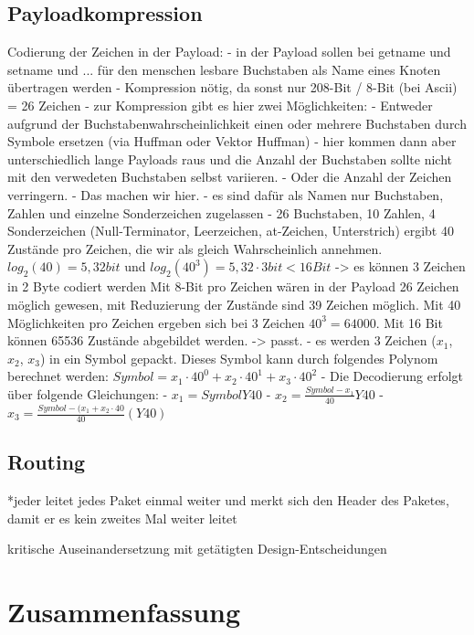 \documentclass{IEEEtran}
\begin{document}
    \subsection{Payloadkompression}
    Codierung der Zeichen in der Payload: 
    - in der Payload sollen bei getname und setname und ... für den menschen lesbare Buchstaben als Name eines Knoten übertragen werden
    - Kompression nötig, da sonst nur 208-Bit / 8-Bit (bei Ascii) = 26 Zeichen
    - zur Kompression gibt es hier zwei Möglichkeiten: 
    - Entweder aufgrund der Buchstabenwahrscheinlichkeit einen oder mehrere Buchstaben durch Symbole ersetzen (via Huffman oder Vektor Huffman)
    - hier kommen dann aber unterschiedlich lange Payloads raus und die Anzahl der Buchstaben sollte nicht mit den verwedeten Buchstaben selbst variieren.
    - Oder die Anzahl der Zeichen verringern.
    - Das machen wir hier.
    - es sind dafür als Namen nur Buchstaben, Zahlen und einzelne Sonderzeichen zugelassen
    - 26 Buchstaben, 10 Zahlen, 4 Sonderzeichen (Null-Terminator, Leerzeichen, at-Zeichen, Unterstrich) ergibt 40 Zustände pro Zeichen, die wir als gleich Wahrscheinlich annehmen.
    $log_{2}(40) = 5,32 bit$
    und 
    $log_{2}(40^3) = 5,32 \cdot 3 bit < 16 Bit$
    -> es können 3 Zeichen in 2 Byte codiert werden
    Mit 8-Bit pro Zeichen wären in der Payload 26 Zeichen möglich gewesen, mit Reduzierung der Zustände sind 39 Zeichen möglich.
    Mit 40 Möglichkeiten pro Zeichen ergeben sich bei 3 Zeichen $40^3 = 64000$. Mit 16 Bit können 65536 Zustände abgebildet werden. -> passt.
    - es werden 3 Zeichen ($x_{1}$, $x_{2}$, $x_{3}$) in ein Symbol gepackt. Dieses Symbol kann durch folgendes Polynom berechnet werden:
    $Symbol = x_{1} \cdot 40^{0} + x_{2} \cdot 40^{1} + x_{3} \cdot 40^{2}$
    - Die Decodierung erfolgt über folgende Gleichungen:
    - $x_{1} = Symbol Y 40$
    - $x_{2} = \frac{Symbol - x_{1}}{40} Y 40$
    - $x_{3} = \frac{Symbol - (x_{1} + x_{2} \cdot 40}{40} (Y 40)$

    \subsection{Routing}
        *jeder leitet jedes Paket einmal weiter und merkt sich den Header des Paketes, damit er es kein zweites Mal weiter leitet


kritische Auseinandersetzung mit getätigten Design-Entscheidungen

\section{Zusammenfassung}
\end{document}
